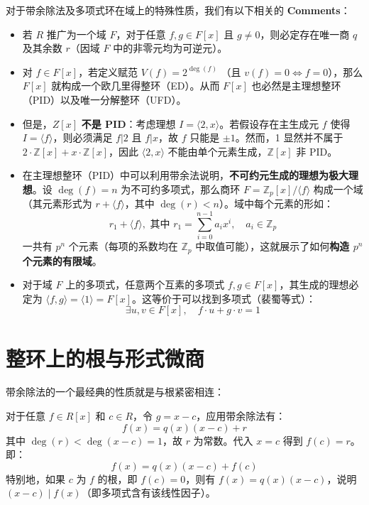 \documentclass[11pt]{article}
\begin{document}
对于带余除法及多项式环在域上的特殊性质，我们有以下相关的 \textbf{Comments}：
\begin{itemize}
    \item 若 $R$ 推广为一个域 $F$，对于任意 $f, g \in F[x]$ 且 $g \neq 0$，则必定存在唯一商 $q$ 及其余数 $r$（因域 $F$ 中的非零元均为可逆元）。
    \item 对 $f \in F[x]$，若定义赋范 $V(f) = 2^{\deg(f)}$ （且 $v(f) = 0 \iff f = 0$），那么 $F[x]$ 就构成一个欧几里得整环（ED）。从而 $F[x]$ 也必然是主理想整环（PID）以及唯一分解整环（UFD）。
    \item 但是，$Z[x]$ \textbf{不是 PID}：考虑理想 $I = \langle 2, x \rangle$。若假设存在主生成元 $f$ 使得 $I = \langle f \rangle$，则必须满足 $f|2$ 且 $f|x$，故 $f$ 只能是 $\pm 1$。然而，1 显然并不属于 $2\cdot\mathbb{Z}[x] + x\cdot\mathbb{Z}[x]$，因此 $\langle 2, x \rangle$ 不能由单个元素生成，$\mathbb{Z}[x]$ 非 PID。
    \item 在主理想整环（PID）中可以利用带余法说明，\textbf{不可约元生成的理想为极大理想}。设 $\deg(f)=n$ 为不可约多项式，那么商环 $F = \mathbb{Z}_p[x]/\langle f \rangle$ 构成一个域（其元素形式为 $r + \langle f \rangle$，其中 $\deg(r) < n$）。域中每个元素的形如：
    $$ r_1 + \langle f \rangle, \text{ 其中 } r_1 = \sum_{i=0}^{n-1} a_i x^i, \quad a_i \in \mathbb{Z}_p $$
    一共有 $p^n$ 个元素（每项的系数均在 $\mathbb{Z}_p$ 中取值可能），这就展示了如何\textbf{构造 $p^n$ 个元素的有限域}。
    \item 对于域 $F$ 上的多项式，任意两个互素的多项式 $f, g \in F[x]$，其生成的理想必定为 $\langle f, g \rangle = \langle 1 \rangle = F[x]$。这等价于可以找到多项式（裴蜀等式）：
    $$ \exists u, v \in F[x], \quad f \cdot u + g \cdot v = 1 $$
\end{itemize}

\section{整环上的根与形式微商}

带余除法的一个最经典的性质就是与根紧密相连：
\begin{cnproperty}[根与因式的带余除法性质]
对于任意 $f \in R[x]$ 和 $c \in R$，令 $g = x-c$，应用带余除法有：
$$ f(x) = q(x)(x-c) + r $$
其中 $\deg(r) < \deg(x-c) = 1$，故 $r$ 为常数。代入 $x=c$ 得到 $f(c) = r$。即：
$$ f(x) = q(x)(x-c) + f(c) $$
特别地，如果 $c$ 为 $f$ 的根，即 $f(c) = 0$，则有 $f(x) = q(x)(x-c)$，说明 $(x-c) \mid f(x)$（即多项式含有该线性因子）。
\end{cnproperty}
\end{document}
